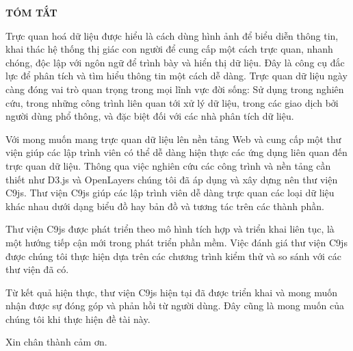 \begin{titlepage}
\centering
	{\scshape\LARGE \textbf{TÓM TẮT} \par}
	\vspace{1cm}
	
\begin{flushleft}
Trực quan hoá dữ liệu được hiểu là cách dùng hình ảnh để biểu diễn thông tin, khai thác hệ thống thị giác con người để cung cấp một cách trực quan, nhanh chóng, độc lập với ngôn ngữ để trình bày và hiển thị dữ liệu. Đây là công cụ đắc lực để phân tích và tìm hiểu thông tin một cách dễ dàng. Trực quan dữ liệu ngày càng đóng vai trò quan trọng trong mọi lĩnh vực đời sống: Sử dụng trong nghiên cứu, trong những công trình liên quan tới xử lý dữ liệu, trong các giao dịch bởi người dùng phổ thông, và đặc biệt
đối với các nhà phân tích dữ liệu.\par

Với mong muốn mang trực quan dữ liệu lên nền tảng Web và cung cấp một thư viện giúp các lập trình viên có thể dễ dàng hiện thực các ứng dụng liên quan đến trực quan dữ liệu. Thông qua việc nghiên cứu các công trình và nền tảng cần thiết như D3.js và OpenLayers chúng tôi đã áp dụng và xây dựng nên thư viện C9js. Thư viện C9js giúp các lập trình viên dễ dàng trực quan các loại dữ liệu khác nhau dưới dạng biểu đồ hay bản đồ và tương tác trên các thành phần.\par

Thư viện C9js được phát triển theo mô hình tích hợp và triển khai liên tục, là một hướng tiếp cận mới trong phát triển phần mềm. Việc đánh giá thư viện C9js được chúng tôi thực hiện dựa trên các chương trình kiểm thử và so sánh với các thư viện đã có.\par

Từ kết quả hiện thực, thư viện C9js hiện tại đã được triển khai và mong muốn nhận được sự đóng góp và phản hồi từ người dùng. Đây cũng là mong muốn của chúng tôi khi thực hiện đề tài này.\par

Xin chân thành cảm ơn. \par
\end{flushleft}


\vfill %
\end{titlepage}